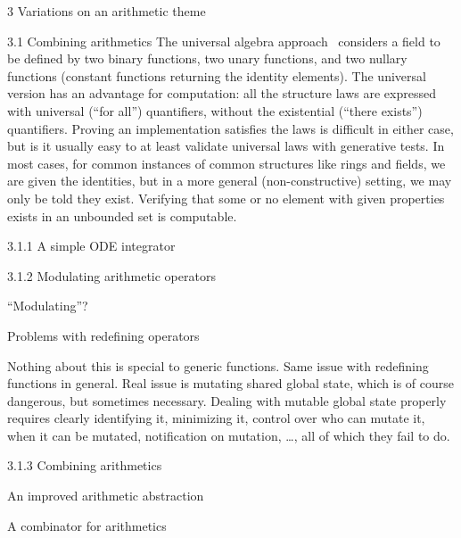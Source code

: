 \documentclass[12pt]{PalisadesLakesBook}
\begin{document}
\begin{plSection}{3 Variations on an arithmetic theme}
\begin{plSection}{3.1 Combining arithmetics}
\NOTE The universal algebra approach~\cite{wiki:UniversalAlgebra} considers a field
to be defined by two binary functions, two unary functions,
and two nullary functions (constant functions returning the
identity elements).
The universal version has an advantage for computation:
all the structure laws are expressed with universal (``for all'')
quantifiers, without the existential (``there exists'')
quantifiers.
Proving an implementation satisfies the laws is difficult 
in either case, but is it usually easy to at least validate
universal laws with generative tests.
In most cases, for common instances of common structures
like rings and fields, we are given the identities,
but in a more general (non-constructive) setting, 
we may only be told they exist.
Verifying that some or no element with given properties exists
in an unbounded set is computable.


\begin{plSection}{3.1.1 A simple ODE integrator}
\end{plSection}%
\begin{plSection}{3.1.2 Modulating arithmetic operators}

``Modulating''?

\begin{plSection}{Problems with redefining operators}

Nothing about this is special to generic functions.
Same issue with redefining functions in general.
Real issue is mutating shared global state,
which is of course dangerous, but sometimes necessary.
Dealing with mutable global state properly requires
clearly identifying it, minimizing it,
control over who can mutate it,
when it can be mutated,
notification on mutation, {\ldots},
all of which they fail to do.

\end{plSection}%
\end{plSection}%
\begin{plSection}{3.1.3 Combining arithmetics}
\begin{plSection}{An improved arithmetic abstraction}
\end{plSection}%
\begin{plSection}{A combinator for arithmetics}


\end{plSection}
\end{plSection}
\end{plSection}
\end{plSection}
\end{document}
